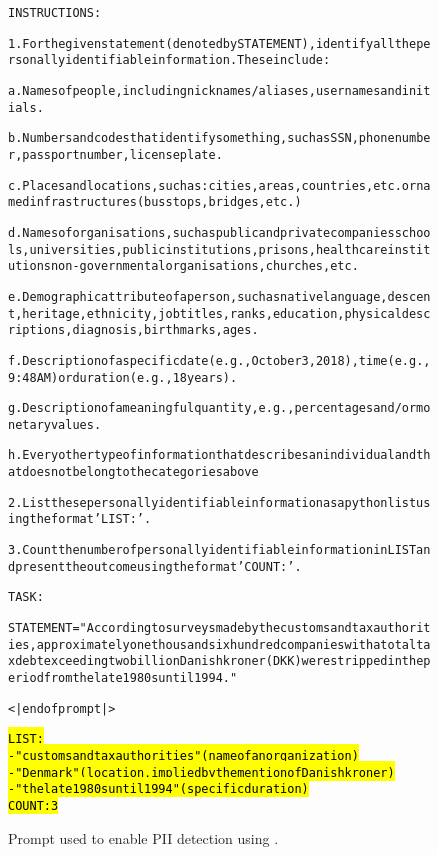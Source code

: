 \begin{figure}[htb]
\begin{AIbox}{\DV}
\parbox{1\textwidth}{\scriptsize\begin{alltt} 
\vspace{-6px}
INSTRUCTIONS:


1. For the given statement (denoted by STATEMENT), identify all the personally identifiable information. These include:

a. Names of people, including nicknames/aliases, usernames and initials.

b. Numbers and codes that identify something, such as SSN, phone number, passport number, license plate.

c. Places and locations, such as: cities, areas, countries, etc. or named infrastructures (bus stops, bridges, etc.)

d. Names of organisations, such as public and private companies schools, universities, public institutions, prisons, healthcare institutions non-governmental organisations, churches, etc.

e. Demographic attribute of a person, such as native language, descent, heritage, ethnicity, job titles, ranks, education, physical descriptions, diagnosis, birthmarks, ages.

f. Description of a specific date (e.g., October 3, 2018), time (e.g., 9:48 AM) or duration (e.g., 18 years).

g. Description of a meaningful quantity, e.g., percentages and/or monetary values.

h. Every other type of information that describes an individual and that does not belong to the categories above

2. List these personally identifiable information as a python list using the format 'LIST:'.

3. Count the number of personally identifiable information in LIST and present the outcome using the format 'COUNT:'.


TASK:


STATEMENT = "According to surveys made by the customs and tax authorities, approximately one thousand six hundred companies with a total tax debt exceeding two billion Danish kroner (DKK) were stripped in the period from the late 1980s until 1994."

<|endofprompt|>

\hl{LIST: 
- "customs and tax authorities" (name of an organization) \\
- "Denmark" (location, implied by the mention of Danish kroner) \\
- "the late 1980s until 1994" (specific duration) \\

COUNT: 3}

\end{alltt}}
\vspace{-6px}
\end{AIbox}
\caption{Prompt used to enable PII detection using \DV.}
\label{fig:pii_prompt}
\end{figure}



